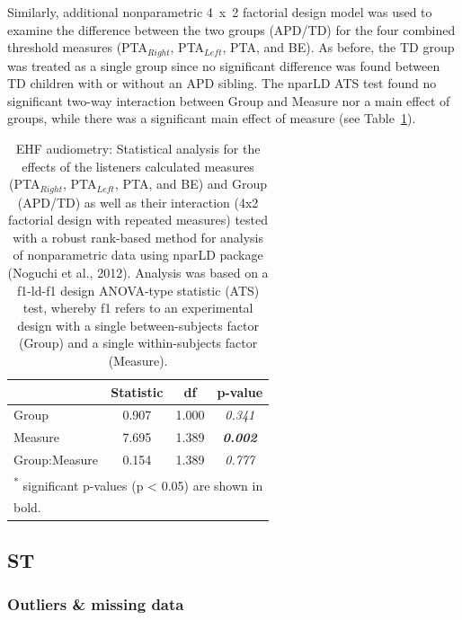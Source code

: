\documentclass[a4paper, twoside]{templates/ociamthesis}
\begin{document}
Similarly, additional nonparametric 4~x~2 factorial design model was used to examine the difference between the two groups (APD/TD) for the four combined threshold measures (PTA\(_{Right}\), PTA\(_{Left}\), PTA, and BE). As before, the TD group was treated as a single group since no significant difference was found between TD children with or without an APD sibling. The nparLD ATS test found no significant two-way interaction between Group and Measure nor a main effect of groups, while there was a significant main effect of measure (see Table~\ref{tab:EHF-PTATabnparLD}).\\

\begin{table}

\caption{\label{tab:EHF-PTATabnparLD}EHF audiometry: Statistical analysis for the effects of the listeners calculated measures (PTA$_{Right}$, PTA$_{Left}$, PTA, and BE) and Group (APD/TD) as well as their interaction (4x2 factorial design with repeated measures) tested with a robust rank-based method for analysis of nonparametric data using nparLD package (Noguchi et al., 2012). Analysis was based on a f1-ld-f1 design ANOVA-type statistic (ATS) test, whereby f1 refers to an experimental design with a single between-subjects factor (Group) and a single within-subjects factor (Measure).}
\centering
\begin{tabular}[t]{lcc>{}c}
\toprule
  & Statistic & df & p-value\\
\midrule
Group & 0.907 & 1.000 & \em{0.341}\\
Measure & 7.695 & 1.389 & \em{\textbf{0.002}}\\
Group:Measure & 0.154 & 1.389 & \em{0.777}\\
\bottomrule
\multicolumn{4}{l}{\textsuperscript{*} significant p-values (p < 0.05) are shown in}\\
\multicolumn{4}{l}{bold.}\\
\end{tabular}
\end{table}

\hypertarget{st}{%
\subsection{ST}\label{st}}

\hypertarget{outliers-missing-data}{%
\subsubsection*{Outliers \& missing data}\label{outliers-missing-data}}
\end{document}
